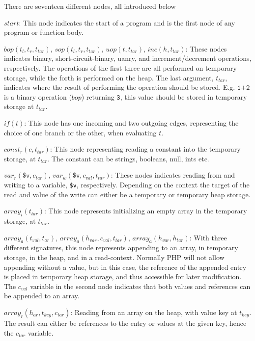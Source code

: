 There are seventeen different nodes, all introduced below
\begin{description}
\item{$\mathit{start}$:} This node indicates the start of a program and is the first node of any program or function body. 
\item{$\mathit{bop}(t_l,t_r, t_{tar})$, $\mathit{sop}(t_l,t_r, t_{tar})$, $\mathit{uop}(t, t_{tar})$, $\mathit{inc}(h, t_{tar})$:} These nodes indicates binary, short-circuit-binary, uanry, and increment/decrement operations, respectively. The operations of the first three are all performed on temporary storage, while the forth is performed on the heap. The last argument, $t_{tar}$, indicates where the result of performing the operation should be stored. E.g. $\texttt{1+2}$ is a binary operation ($\mathit{bop}$) returning $\texttt{3}$, this value should be stored in temporary storage at $t_{tar}$. 
\item{$\mathit{if}(t)$:} This node has one incoming and two outgoing edges, representing the choice of one branch or the other, when evaluating $t$. 
\item{$\mathit{const}_r(c, t_{tar})$:} This node representing reading a constant into the temporary storage, at $t_{tar}$. The constant can be strings, booleans, null, ints etc.
\item{$\mathit{var}_r(\texttt{\$v}, c_{tar})$, $\mathit{var}_w(\texttt{\$v}, c_{val}, t_{tar})$:} These nodes indicates reading from and writing to a variable, \texttt{\$v}, respectively. Depending on the context the target of the read and value of the write can either be a temporary or temporary heap storage. 
\item{$\mathit{array}_i(t_{tar})$:} This node represents initializing an empty array in the temporary storage, at $t_{tar}$.
\item{$\mathit{array}_a(t_{val}, t_{ar})$, $\mathit{array}_a(h_{var}, c_{val}, t_{tar})$, $\mathit{array}_a(h_{var}, h_{tar})$:} With three different signatures, this node represents appending to an array, in temporary storage, in the heap, and in a read-context. Normally PHP will not allow appending without a value, but in this case, the reference of the appended entry is placed in temporary heap storage, and thus accessible for later modification. The $c_{val}$ variable in the second node indicates that both values and references can be appended to an array.
\item{$\mathit{array}_r(h_{ar}, t_{key}, c_{tar})$:} Reading from an array on the heap, with value key at $t_{key}$. The result can either be references to the entry or values at the given key, hence the $c_{tar}$ variable. 

\end{description}
